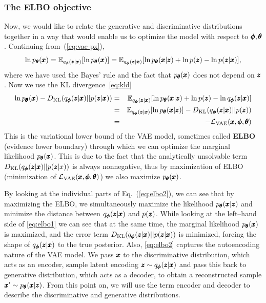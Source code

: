 \subsubsection{The ELBO objective}
Now, we would like to relate the generative and discriminative distributions together in a way that would enable us to optimize the model with respect to $\pmb{{\phi}},\pmb{{\theta}}$. Continuing from~(\ref{eq:vae-px}),
\begin{equation}
\ln p_{\vc{\theta}}(\vc{x})=\mathbb{E}_{q_{\vc{\phi}}(\vc{z}|\vc{x})}\left[\ln p_{\vc{\theta}}(\vc{x})\right]=\mathbb{E}_{q_{\vc{\phi}}(\vc{z}|\vc{x})}\left[\ln p_{\vc{\theta}}(\vc{x}|\vc{z})+\ln p(\vc{z})-\ln p(\vc{z}|\vc{x})\right],
\end{equation}
where we have used the Bayes' rule and the fact that $p_{\pmb{{\theta}}}(\pmb{{x}})$ does not depend on $\pmb{{z}}$. Now we use the KL divergence~\eqref{eq:kld}
\begin{eqnarray}
\ln p_{\vc{\vc{\theta}}}(\vc{x})-D_{\text{KL}}\left(q_{\vc{\phi}}(\vc{z}|\vc{x})||p(\vc{z}|\vc{x})\right) & = & \mathbb{E}_{q_{\vc{\phi}}(\vc{z}|\vc{x})}\left[\ln p_{\vc{\theta}}(\vc{x}|\vc{z})+\ln p(\vc{z})-\ln q_{\vc{\phi}}(\vc{z}|\vc{x})\right]\label{eq:elbo1}\\
 & = & \mathbb{E}_{q_{\vc{\phi}}(\vc{z}|\vc{x})}\left[\ln p_{\vc{\theta}}(\vc{x}|\vc{z})\right]-D_{\text{KL}}\left(q_{\vc{\phi}}(\vc{z}|\vc{x})||p(\vc{z})\right)\label{eq:elbo2}\\
 & = & - \mathcal{L}_{\text{VAE}}(\vc{x},\vc{\phi},\vc{\theta})\label{eq:elbo3}
\end{eqnarray}
This is the variational lower bound of the VAE model, sometimes called \textbf{ELBO} (evidence lower boundary) through which we can optimize the marginal likelihood $p_{\pmb{{\theta}}}(\pmb{{x}})$. This is due to the fact that the analytically unsolvable term $D_{\text{KL}}\left(q_{\vc{\phi}}(\vc{z}|\vc{x})||p(\vc{z}|x)\right)$ is always nonnegative, thus by maximization of ELBO (minimization of $\mathcal{L}_{\text{VAE}}(\pmb{{x}},\pmb{{\phi}},\pmb{{\theta}})$) we also maximize $p_{\pmb{{\theta}}}(\pmb{{x}})$.

By looking at the individual parts of Eq.~(\ref{eq:elbo2}), we can see that by maximizing the ELBO, we simultaneously maximize the likelihood $p_{\pmb{{\theta}}}(\pmb{{x}}|\pmb{{z}})$ and minimize the distance between $q_{\pmb{{\phi}}}(\pmb{{z}}|\pmb{{x}})$ and $p(\pmb{{z}})$. While looking at the left--hand side of \eqref{eq:elbo1} we can see that at the same time, the marginal likelihood $p_{\pmb{{\theta}}}(\pmb{{x}})$ is maximized, and the error term $D_{\text{KL}}\left(q_{\vc{\phi}}(\vc{z}|\vc{x})||p(\vc{z}|\vc{x})\right)$ is minimized, forcing the shape of $q_{\pmb{{\phi}}}(\pmb{{z}}|\pmb{{x}})$ to the true posterior. Also, \eqref{eq:elbo2} captures the autoencoding nature of the VAE model. We pass $\pmb{{x}}$ to the discriminative distribution, which acts as an encoder, sample latent encoding $\pmb{{z}} \sim q_{\pmb{{\phi}}}(\pmb{{z}}|\pmb{{x}})$ and pass this back to generative distribution, which acts as a decoder, to obtain a reconstructed sample $\pmb{{x}}' \sim p_{\pmb{{\theta}}}(\pmb{{x}}|\pmb{{z}})$. From this point on, we will use the term encoder and decoder to describe the discriminative and generative distributions.


